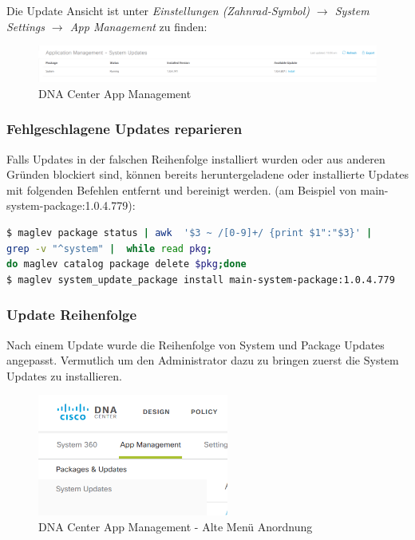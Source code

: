 Die Update Ansicht ist unter \textit{Einstellungen (Zahnrad-Symbol) $\rightarrow$ System Settings  $\rightarrow$ App Management} zu finden:

\begin{figure}[H]
	\centering
	\includegraphics[width=\columnwidth]{img/sc_009.png}
	\caption{DNA Center App Management}
	\label{fig:dna-center-gui-update-1}
\end{figure}

\subsubsection{Fehlgeschlagene Updates reparieren}
Falls Updates in der falschen Reihenfolge installiert wurden oder aus anderen Gründen blockiert sind, können bereits heruntergeladene oder installierte Updates mit folgenden Befehlen entfernt und bereinigt werden.
(am Beispiel von main-system-package:1.0.4.779):

\begin{lstlisting}[language=bash]
$ maglev package status | awk  '$3 ~ /[0-9]+/ {print $1":"$3}' | 
grep -v "^system" |  while read pkg; 
do maglev catalog package delete $pkg;done
$ maglev system_update_package install main-system-package:1.0.4.779
\end{lstlisting}

\subsubsection{Update Reihenfolge}
Nach einem Update wurde die Reihenfolge von System und Package Updates angepasst. Vermutlich um den Administrator dazu zu bringen zuerst die System Updates zu installieren. 

\begin{figure}[H]
	\centering
	\includegraphics[height=4cm]{img/sc_010.png}
	\caption{DNA Center App Management - Alte Menü Anordnung}
	\label{fig:dna-center-gui-update-2}
\end{figure}


